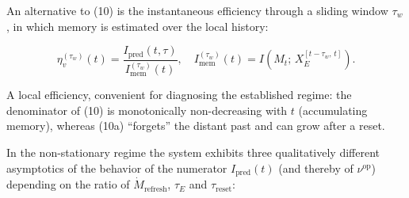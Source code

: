 \documentclass[pdflatex,sn-mathphys-ay]{sn-jnl}
\begin{document}
An alternative to (10) is the instantaneous efficiency through a sliding window \(\tau_w\), in which memory is estimated over the local history:



\begin{equation}\eta_v^{(\tau_w)}(t) = \frac{I_{\text{pred}}(t, \tau)}{I_{\text{mem}}^{(\tau_w)}(t)}, \quad I_{\text{mem}}^{(\tau_w)}(t) = I\!\left(M_t;\, X_E^{[t-\tau_w,\,t]}\right). \tag{10a}\end{equation}



A local efficiency, convenient for diagnosing the established regime: the denominator of (10) is monotonically non-decreasing with \(t\) (accumulating memory), whereas (10a) ``forgets'' the distant past and can grow after a reset.



In the non-stationary regime the system exhibits three qualitatively different asymptotics of the behavior of the numerator \(I_{\text{pred}}(t)\) (and thereby of \(\nu^{\text{op}}\)) depending on the ratio of \(\dot M_{\text{refresh}}\), \(\tau_E\) and \(\tau_{\text{reset}}\):
\end{document}
